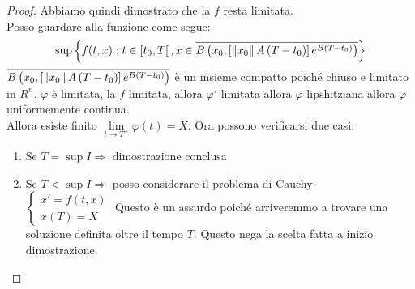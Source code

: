 \begin{proof}
	Abbiamo quindi dimostrato che la $f$ resta limitata.\\
	Posso guardare alla funzione come segue:\\
	$$
	\sup
	\left\{f(t,x): t\in\left[t_0,T\right[, x\in \overline{B\left(x_0,
		\left[ 
			\left\|x_0\right\| A \left(T-t_0\right)
		\right]e^{B\left(T-t_0\right)}\right)}
	\right\}
	$$
	$\overline{B\left(x_0,
		\left[ 
		\left\|x_0\right\| A \left(T-t_0\right)
		\right]e^{B\left(T-t_0\right)}\right)}
	$ è un insieme compatto poiché chiuso e limitato in $R^n$, $\varphi$ è limitata, la $f$ limitata, allora $ \varphi'$ limitata allora $\varphi$ lipshitziana allora $\varphi$ uniformemente continua.\\
		Allora esiste finito $\lim\limits_{t\to T^{-}}\varphi(t)=X$. Ora possono verificarsi due casi:\\
	\begin{enumerate}
		\item Se $T=\sup I \Rightarrow$ dimostrazione conclusa
		\item Se $T<\sup I \Rightarrow$ posso considerare il problema di Cauchy \\
		$\left\{ \begin{matrix}  x'=f(t,x)\\x(T)=X \end{matrix} \right.$ Questo è un assurdo poiché arriveremmo a trovare una soluzione definita oltre il tempo $T$. Questo nega la scelta fatta a inizio dimostrazione.
		\end{enumerate}
\end{proof}
